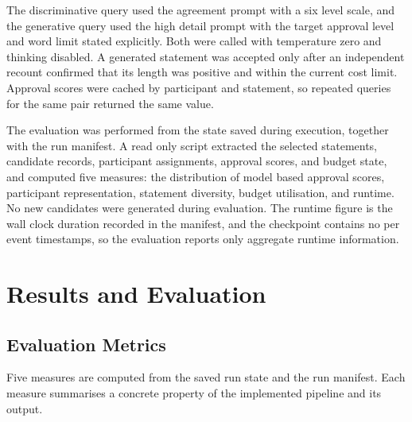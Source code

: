 \documentclass[letterpaper,11pt]{article}
\theoremstyle{plain}
\theoremstyle{definition}
\begin{document}
The discriminative query used the agreement prompt with a six level scale, and the generative query used the high detail prompt with the target approval level and word limit stated explicitly. Both were called with temperature zero and thinking disabled. A generated statement was accepted only after an independent recount confirmed that its length was positive and within the current cost limit. Approval scores were cached by participant and statement, so repeated queries for the same pair returned the same value.

The evaluation was performed from the state saved during execution, together with the run manifest. A read only script extracted the selected statements, candidate records, participant assignments, approval scores, and budget state, and computed five measures: the distribution of model based approval scores, participant representation, statement diversity, budget utilisation, and runtime. No new candidates were generated during evaluation. The runtime figure is the wall clock duration recorded in the manifest, and the checkpoint contains no per event timestamps, so the evaluation reports only aggregate runtime information.

\section{Results and Evaluation}

\subsection{Evaluation Metrics}

Five measures are computed from the saved run state and the run manifest. Each measure summarises a concrete property of the implemented pipeline and its output.
\end{document}
